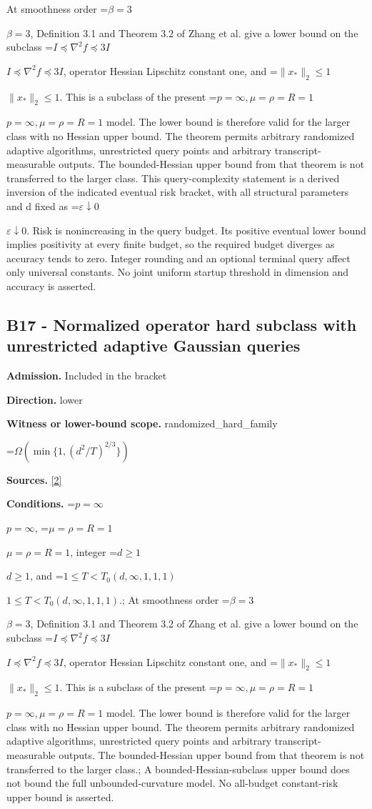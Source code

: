 \documentclass[10pt,a4paper]{article}
\newcommand{\AtlasMath}[1]{\par\begingroup\centering\setbox0=\hbox{$\displaystyle #1$}\ifdim\wd0>1.4\linewidth\typeout{ATLAS WIDE FORMULA: \the\wd0}\fi\ifdim\wd0>\linewidth\resizebox{\linewidth}{!}{\box0}\else\box0\fi\par\endgroup}
\newcommand{\AtlasInlineMath}[1]{\begingroup\setbox0=\hbox{$#1$}\ifdim\wd0>.4\linewidth\endgroup\AtlasMath{#1}\else\endgroup$#1$\fi}
\begin{document}
At smoothness order \AtlasInlineMath{\beta=3}, Definition 3.1 and Theorem 3.2 of Zhang et al. give a lower bound on the subclass \AtlasInlineMath{I\preceq\nabla^2 f\preceq3I}, operator Hessian Lipschitz constant one, and \AtlasInlineMath{\|x_*\|_2\le1}. This is a subclass of the present \AtlasInlineMath{p=\infty,\mu=\rho=R=1} model. The lower bound is therefore valid for the larger class with no Hessian upper bound. The theorem permits arbitrary randomized adaptive algorithms, unrestricted query points and arbitrary transcript-measurable outputs. The bounded-Hessian upper bound from that theorem is not transferred to the larger class. This query-complexity statement is a derived inversion of the indicated eventual risk bracket, with all structural parameters and d fixed as \AtlasInlineMath{\varepsilon\downarrow0}. Risk is nonincreasing in the query budget. Its positive eventual lower bound implies positivity at every finite budget, so the required budget diverges as accuracy tends to zero. Integer rounding and an optional terminal query affect only universal constants. No joint uniform startup threshold in dimension and accuracy is asserted.



\subsection{B17 - Normalized operator hard subclass with unrestricted adaptive Gaussian queries}


\textbf{Admission.} Included in the bracket



\textbf{Direction.} lower



\textbf{Witness or lower-bound scope.} randomized\_hard\_family



\AtlasMath{\Omega(\min\{1,(d^2/T)^{2/3}\})}


\textbf{Sources.} \href{https://arxiv.org/html/2610.00276v2}{[2]}



\textbf{Conditions.} \AtlasInlineMath{p=\infty}, \AtlasInlineMath{\mu=\rho=R=1}, integer \AtlasInlineMath{d\ge1}, and \AtlasInlineMath{1\le T<T_0(d,\infty,1,1,1)}.; At smoothness order \AtlasInlineMath{\beta=3}, Definition 3.1 and Theorem 3.2 of Zhang et al. give a lower bound on the subclass \AtlasInlineMath{I\preceq\nabla^2 f\preceq3I}, operator Hessian Lipschitz constant one, and \AtlasInlineMath{\|x_*\|_2\le1}. This is a subclass of the present \AtlasInlineMath{p=\infty,\mu=\rho=R=1} model. The lower bound is therefore valid for the larger class with no Hessian upper bound. The theorem permits arbitrary randomized adaptive algorithms, unrestricted query points and arbitrary transcript-measurable outputs. The bounded-Hessian upper bound from that theorem is not transferred to the larger class.; A bounded-Hessian-subclass upper bound does not bound the full unbounded-curvature model. No all-budget constant-risk upper bound is asserted.
\end{document}
